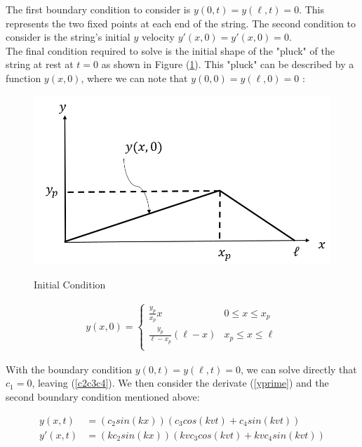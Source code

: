 \documentclass[%
 reprint,
 amsmath,amssymb,
 aps,
]{revtex4-1}
\begin{document}
The first boundary condition to consider is $y(0,t)=y(\ell,t)=0$. This represents the two fixed points at each end of the string. The second condition to consider is the string's initial $y$ velocity $y'(x,0)=y'(x,0)=0.$\\

The final condition required to solve is the initial shape of the "pluck" of the string at rest at $t=0$ as shown in Figure (\ref{boundary}). This "pluck" can be described by a function $y(x,0)$, where we can note that $y(0,0)=y(\ell,0)=0$ :

\begin{figure}[h]
\caption{Initial Condition}
\includegraphics[width=\columnwidth]{boundary.png}
\label{boundary}
\end{figure}

\begin{align} \label{y0}
y(x,0) =  
   \begin{cases} 
      \frac{y_p}{x_p}x & 0 \leq x\leq x_p \\
      \frac{y_p}{\ell-x_p}(\ell-x) & x_p \leq x\leq \ell \\
   \end{cases}
\end{align}

With the boundary condition $y(0,t)=y(\ell,t)=0$, we can solve directly that $c_1 = 0$, leaving (\ref{c2c3c4}). We then consider the derivate (\ref{yprime})  and the second boundary condition mentioned above:

\begin{align}
y(x,t) &=(c_2sin(kx))(c_3 cos(kvt) + c_4sin(kvt)) \label{c2c3c4}\\
y'(x,t) &= (kc_2sin(kx))(kvc_3cos(kvt)+kvc_4sin(kvt)) \label{yprime}
\end{align}
\end{document}
